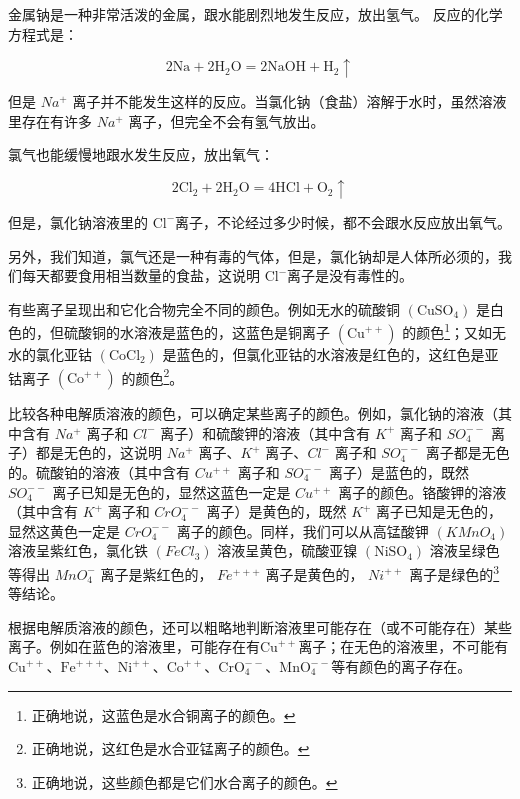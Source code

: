 金属钠是一种非常活泼的金属，跟水能剧烈地发生反应，放出氢气。
反应的化学方程式是：

\[
2 \mathrm{Na} + 2 \mathrm{H} _ {2} \mathrm{O} = 2 \mathrm{NaOH} + \mathrm{H} _ {2} \uparrow
\]

但是 \(Na^{+}\)
离子并不能发生这样的反应。当氯化钠（食盐）溶解于水时，虽然溶液里存在有许多
\(Na^{+}\) 离子，但完全不会有氢气放出。

氯气也能缓慢地跟水发生反应，放出氧气：

\[
2 \mathrm{Cl} _ {2} + 2 \mathrm{H} _ {2} \mathrm{O} = 4 \mathrm{HCl} + \mathrm{O} _ {2} \uparrow
\]

但是，氯化钠溶液里的
\(\mathrm{Cl}^{-}\)离子，不论经过多少时候，都不会跟水反应放出氧气。

另外，我们知道，氯气还是一种有毒的气体，但是，氯化钠却是人体所必须的，我们每天都要食用相当数量的食盐，这说明
\(\mathrm{Cl}^{-}\)离子是没有毒性的。

有些离子呈现出和它化合物完全不同的颜色。例如无水的硫酸铜
\(\left(\mathrm{CuSO}_{4}\right)\)
是白色的，但硫酸铜的水溶液是蓝色的，这蓝色是铜离子
\(\left(\mathrm{Cu}^{++}\right)\) 的颜色\footnote{正确地说，这蓝色是水合铜离子的颜色。}；又如无水的氯化亚钴
\(\left(\mathrm{CoCl}_{2}\right)\)
是蓝色的，但氯化亚钴的水溶液是红色的，这红色是亚钴离子
\(\left(\mathrm{Co}^{++}\right)\) 的颜色\footnote{正确地说，这红色是水合亚锰离子的颜色。}。

比较各种电解质溶液的颜色，可以确定某些离子的颜色。例如，氯化钠的溶液（其中含有
\(Na^{+}\) 离子和 \(Cl^{-}\) 离子）和硫酸钾的溶液（其中含有 \(K^{+}\)
离子和 \(SO_{4}^{--}\) 离子）都是无色的，这说明 \(Na^{+}\)
离子、\(K^{+}\) 离子、\(Cl^{-}\) 离子和 \(SO_{4}^{--}\)
离子都是无色的。硫酸铂的溶液（其中含有 \(Cu^{++}\) 离子和
\(SO_{4}^{--}\) 离子）是蓝色的，既然 \(SO_{4}^{--}\)
离子已知是无色的，显然这蓝色一定是 \(Cu^{++}\)
离子的颜色。铬酸钾的溶液（其中含有 \(K^{+}\) 离子和 \(CrO_{4}^{--}\)
离子）是黄色的，既然 \(K^{+}\) 离子已知是无色的，显然这黄色一定是
\(CrO_{4}^{--}\) 离子的颜色。同样，我们可以从高锰酸钾 \((KMnO_{4})\)
溶液呈紫红色，氯化铁 \((FeCl_{3})\) 溶液呈黄色，硫酸亚镍
\(\left(\mathrm{NiSO}_{4}\right)\) 溶液呈绿色等得出 \(MnO_{4}^{-}\)
离子是紫红色的， \(Fe^{+++}\) 离子是黄色的， \(Ni^{++}\)
离子是绿色的\footnote{正确地说，这些颜色都是它们水合离子的颜色。}等结论。

根据电解质溶液的颜色，还可以粗略地判断溶液里可能存在（或不可能存在）某些离子。例如在蓝色的溶液里，可能存在有\(\mathrm{Cu}^{++}\)离子；在无色的溶液里，不可能有\(\mathrm{Cu}^{++}\)、\(\mathrm{Fe}^{+++}\)、\(\mathrm{Ni}^{++}\)、\(\mathrm{Co}^{++}\)、\(\mathrm{CrO}_{4}^{--}\)、\(\mathrm{MnO}_{4}^{--}\)等有颜色的离子存在。


